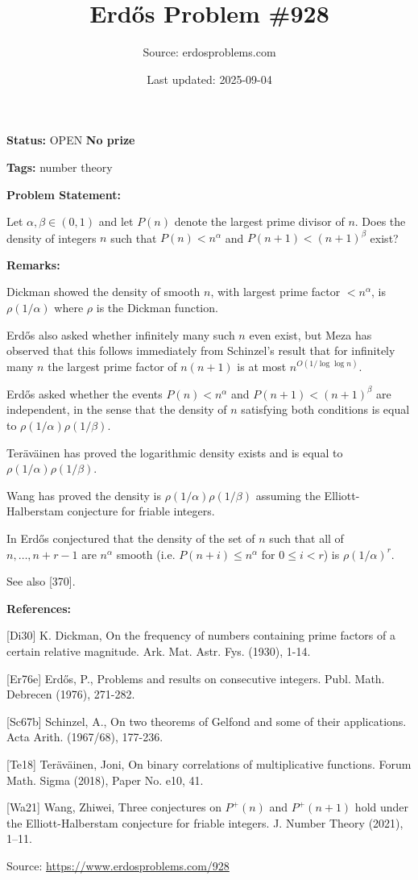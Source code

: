 \documentclass{article}
\title{Erd\H{o}s Problem \#928}
\date{Last updated: 2025-09-04}
\author{Source: erdosproblems.com}
\begin{document}
\maketitle

\noindent\textbf{Status:} OPEN \quad \textbf{No prize}

\noindent\textbf{Tags:} number theory

\medskip
\noindent\textbf{Problem Statement:}

Let $\alpha,\beta\in (0,1)$ and let $P(n)$ denote the largest prime divisor of $n$. Does the density of integers $n$ such that $P(n)<n^{\alpha}$ and $P(n+1)<(n+1)^\beta$ exist?

\bigskip
\noindent\textbf{Remarks:}

Dickman \cite{Di30} showed the density of smooth $n$, with largest prime factor $<n^\alpha$, is $\rho(1/\alpha)$ where $\rho$ is the Dickman function.

Erd\H{o}s also asked whether infinitely many such $n$ even exist, but Meza has observed that this follows immediately from Schinzel's result \cite{Sc67b} that for infinitely many $n$ the largest prime factor of $n(n+1)$ is at most $n^{O(1/\log\log n)}$.

Erd\H{o}s asked whether the events $P(n)<n^\alpha$ and $P(n+1)<(n+1)^\beta$ are independent, in the sense that the density of $n$ satisfying both conditions is equal to $\rho(1/\alpha)\rho(1/\beta)$. 

Ter\"{a}v\"{a}inen \cite{Te18} has proved the logarithmic density exists and is equal to $\rho(1/\alpha)\rho(1/\beta)$. 

Wang \cite{Wa21} has proved the density is $\rho(1/\alpha)\rho(1/\beta)$ assuming the Elliott-Halberstam conjecture for friable integers.

In \cite{Er76e} Erd\H{o}s conjectured that the density of the set of $n$ such that all of $n,\ldots,n+r-1$ are $n^{\alpha}$ smooth (i.e. $P(n+i)\leq n^{\alpha}$ for $0\leq i<r$) is $\rho(1/\alpha)^r$.

See also [370].

\bigskip
\noindent\textbf{References:}

[Di30] K. Dickman, On the frequency of numbers containing prime factors of a certain relative magnitude. Ark. Mat. Astr. Fys. (1930), 1-14.
 
 [Er76e] Erd\H{o}s, P., Problems and results on consecutive integers. Publ. Math. Debrecen (1976), 271-282.
 
 [Sc67b] Schinzel, A., On two theorems of Gelfond and some of their applications. Acta Arith. (1967/68), 177-236.
 
 [Te18] Ter\"{a}v\"{a}inen, Joni, On binary correlations of multiplicative functions. Forum Math. Sigma (2018), Paper No. e10, 41.
 
 [Wa21] Wang, Zhiwei, Three conjectures on {$P^+(n)$} and {$P^+(n+1)$} hold under
the {E}lliott-{H}alberstam conjecture for friable integers. J. Number Theory (2021), 1--11.

\bigskip
\noindent\small{Source: \url{https://www.erdosproblems.com/928}}
\end{document}
